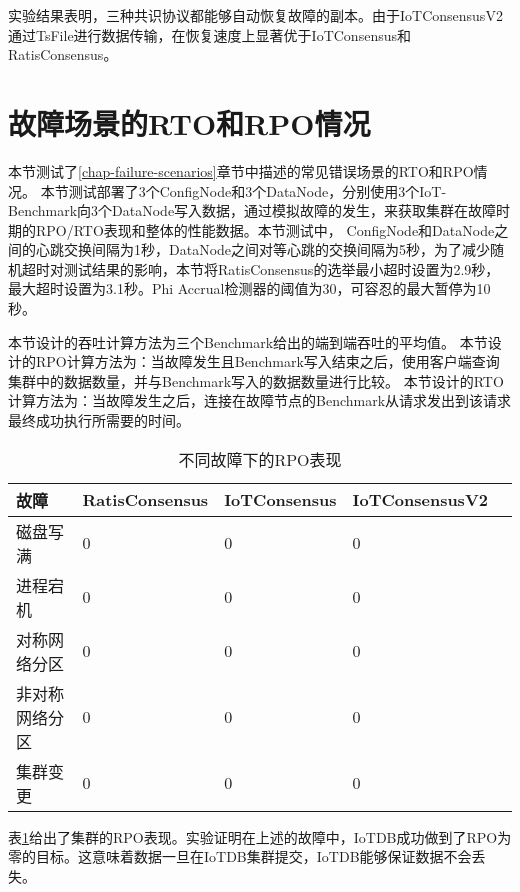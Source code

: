 实验结果表明，三种共识协议都能够自动恢复故障的副本。由于IoTConsensusV2通过TsFile进行数据传输，在恢复速度上显著优于IoTConsensus和RatisConsensus。


\section{故障场景的RTO和RPO情况}



本节测试了\ref{chap-failure-scenarios}章节中描述的常见错误场景的RTO和RPO情况。
本节测试部署了3个ConfigNode和3个DataNode，分别使用3个IoT-Benchmark向3个DataNode写入数据，通过模拟故障的发生，来获取集群在故障时期的RPO/RTO表现和整体的性能数据。本节测试中，
ConfigNode和DataNode之间的心跳交换间隔为1秒，DataNode之间对等心跳的交换间隔为5秒，为了减少随机超时对测试结果的影响，本节将RatisConsensus的选举最小超时设置为2.9秒，最大超时设置为3.1秒。Phi Accrual检测器的阈值为30，可容忍的最大暂停为10秒。


本节设计的吞吐计算方法为三个Benchmark给出的端到端吞吐的平均值。
本节设计的RPO计算方法为：当故障发生且Benchmark写入结束之后，使用客户端查询集群中的数据数量，并与Benchmark写入的数据数量进行比较。
本节设计的RTO计算方法为：当故障发生之后，连接在故障节点的Benchmark从请求发出到该请求最终成功执行所需要的时间。


\begin{table}[h!]
    \centering
    \caption{不同故障下的RPO表现}
    \label{tab:exp-rpo-overview}
    \begin{tabular}{@{}lllll@{}}
        \toprule
        故障 & RatisConsensus & IoTConsensus & IoTConsensusV2 \\
        \midrule
        磁盘写满 & 0 & 0 & 0  \\
        进程宕机 & 0 & 0 & 0  \\
        对称网络分区 & 0 & 0 & 0  \\
        非对称网络分区 & 0 & 0 & 0  \\
        集群变更 & 0 & 0 & 0  \\
        \bottomrule
    \end{tabular}
  \end{table}

表\ref{tab:exp-rpo-overview}给出了集群的RPO表现。实验证明在上述的故障中，IoTDB成功做到了RPO为零的目标。这意味着数据一旦在IoTDB集群提交，IoTDB能够保证数据不会丢失。



